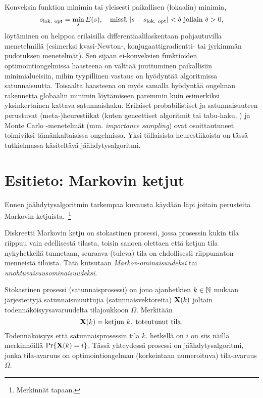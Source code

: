Konveksin funktion minimin tai yleisesti paikallisen (lokaalin) minimin,
\begin{equation}
    s_\text{lok. opt} = \min_s E(s), \quad \text{missä } \lvert s - s_{\text{lok. opt}}\rvert < \delta \text{ jollain } \delta > 0,
\end{equation}
löytäminen on helppoa erilaisilla differentiaalilaskentaan pohjautuvilla menetelmillä
(esimerksi kvasi-Newton-, konjugaattigradientti- tai jyrkimmän pudotuksen menetelmät).
Sen sijaan ei-konveksien funktioiden optimointiongelmissa haasteena on välttää juuttuminen paikallisiin minimialueisiin,
mihin tyypillinen vastaus on hyödyntää algoritmissa satunnaisuutta.
Toisaalta haasteena on myös samalla hyödyntää ongelman rakennetta globaalin minimin löytämiseen paremmin kuin esimerkiksi yksinkertainen kattava satunnaishaku.
Erilaiset probabilistiset ja satunnaisuuteen perustuvat (meta-)heurestiikat (kuten geneettiset algoritmit tai tabu-haku, \cite[ks. esim.][]{glover03}) ja Monte Carlo -menetelmät (mm. \emph{importance sampling}) ovat osoittautuneet toimiviksi tämänkaltaisissa ongelmissa.
Yksi tällaisista heurestiikoista on tässä tutkielmassa käsiteltävä jäähdytysalgoritmi.
\cite{salamonetal}

\section{Esitieto: Markovin ketjut}
\label{sec:esitieto_markovin_ketjut}

Ennen jäähdytysalgoritmin tarkempaa kuvausta käydään läpi joitain perusteita Markovin ketjuista.~\footnote{Merkinnät \cite{laarhoven} tapaan.}

Diskreetti Markovin ketju on stokastinen prosessi, jossa prosessin kukin tila riippuu vain edellisestä tilasta,
toisin sanoen olettaen että ketjun tila nykyhetkellä tunnetaan, seuraava (tuleva) tila on ehdollisesti riippumaton menneistä tiloista.
Tätä kutsutaan \emph{Markov-ominaisuudeksi} tai \emph{unohtuvaisuusominaisuudeksi}.

\begin{maar}
    Stokastinen prosessi (satunnaisprosessi) on jono ajanhetkien $k \in \mathbb{N}$ mukaan järjestettyjä satunnaismuuttujia (satunnaisvektoreita) $\mathbf{X}(k)$ joltain todennäköisyysavaruudelta tilajoukkoon $\Omega$.
    Merkitään
    \begin{equation}
        \mathbf{X}(k) = \text{ketjun $k$. toteutunut tila}.
    \end{equation}
    Todennäköisyys että satunnaisprosessin tila $k$. hetkellä on $i$ on siis näillä merkinnöillä $\Pr\{ \mathbf{X}(k) = i\}$.
    Tässä yhteydessä prosessi on jäähdytysalgoritmi, jonka tila-avaruus on optimointiongelman (korkeintaan numeroituva) tila-avaruus $\Omega$.
\end{maar}

